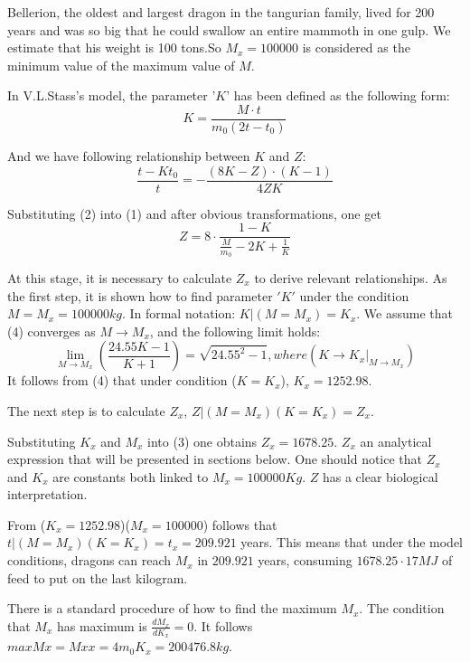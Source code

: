 \documentclass{mcmthesis}
\begin{document}
Bellerion, the oldest and largest dragon in the tangurian family, lived for 200 years and was so big that he could swallow an entire mammoth in one gulp.
We estimate that his weight is 100 tons.So $M_{x}=100000$ is considered as the minimum value of the maximum value of $M$.

In V.L.Stass’s model, the parameter '$K$' has been defined as the following form:
\begin{equation}
    K=\frac{M\cdot t}{m_{0}(2t-t_{0})}
\end{equation}

And we have following relationship between $K$ and $Z$:
\begin{equation}
    \frac{t-Kt_{0}}{t}=-\frac{(8K-Z)\cdot (K-1)}{4ZK}
\end{equation}

Substituting (2) into (1) and after obvious transformations, one get
\begin{equation}
    Z=8\cdot \frac{1-K}{\frac{M}{m_{0}}-2K+\frac{1}{K}}
\end{equation}

At this stage, it is necessary to calculate $Z_{x}$ to derive relevant relationships. 
As the first step, it is shown how to find parameter $'K'$ under the condition $M = M_{x} = 100000 kg$. 
In formal notation: $K|(M=M_{x}) = K_{x}$. We assume that (4) converges as $M\rightarrow M_{x}$,
and the following limit holds:
\begin{equation}
    \lim_{M \to M_{x}}(\frac{24.55K-1}{K+1})=\sqrt{24.55^{2}-1}, where (K\rightarrow K_{x}|_{M\rightarrow M_{x}})   
\end{equation}
It follows from (4) that under condition ($K= K_{x}$), $K_{x} = 1252.98$.

The next step is to calculate $Z_{x}$, $Z|(M=M_{x})(K=K_{x}) = Z_{x}$.

Substituting $K_{x}$ and $M_{x}$ into (3) one obtains $Z_{x}= 1678.25$. $Z_{x}$ an
analytical expression that will be presented in sections below. One should
notice that $Z_{x}$ and $K_{x}$ are constants both linked to $M_{x}=100000Kg$.
$Z$ has a clear biological interpretation.

From ($K_{x}=1252.98$)($M_{x}=100000$) follows that $t|(M=M_{x})(K=K_{x}) = t_{x} = 209.921$
years. This means that under the model conditions, dragons can reach $M_{x}$ in $209.921$ years, 
consuming $1678.25\cdot 17 MJ$ of feed to put on the last kilogram. 

There is a standard procedure of how to find the maximum $M_{x}$. The
condition that $M_{x}$  has maximum is $\frac{dM_{x}}{dK_{x}} = 0$. 
It follows $max Mx= Mxx = 4m_{0}K_{x} = 200476.8 kg.$
\end{document}
